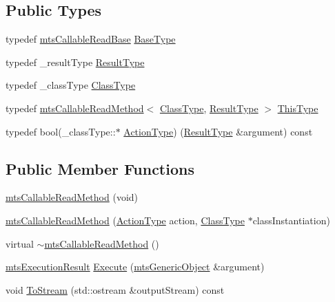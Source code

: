 \subsection*{Public Types}
\begin{DoxyCompactItemize}
\item 
typedef \hyperlink{classmts_callable_read_base}{mts\+Callable\+Read\+Base} \hyperlink{classmts_callable_read_method_a83876b0239f91889b077ab015b11f297}{Base\+Type}
\item 
typedef \+\_\+result\+Type \hyperlink{classmts_callable_read_method_ae1add51b4fb434797e00a79fe31aa7de}{Result\+Type}
\item 
typedef \+\_\+class\+Type \hyperlink{classmts_callable_read_method_a44650138085a29d60a4f3cb3616abbbf}{Class\+Type}
\item 
typedef \hyperlink{classmts_callable_read_method}{mts\+Callable\+Read\+Method}$<$ \hyperlink{classmts_callable_read_method_a44650138085a29d60a4f3cb3616abbbf}{Class\+Type}, \hyperlink{classmts_callable_read_method_ae1add51b4fb434797e00a79fe31aa7de}{Result\+Type} $>$ \hyperlink{classmts_callable_read_method_af176b353a29900c0d650356c559c4cdd}{This\+Type}
\item 
typedef bool(\+\_\+class\+Type\+::$\ast$ \hyperlink{classmts_callable_read_method_a9e05546d6f486e77f1df0c2b079dd7e1}{Action\+Type}) (\hyperlink{classmts_callable_read_method_ae1add51b4fb434797e00a79fe31aa7de}{Result\+Type} \&argument) const 
\end{DoxyCompactItemize}
\subsection*{Public Member Functions}
\begin{DoxyCompactItemize}
\item 
\hyperlink{classmts_callable_read_method_aaf583c2ff199486fe6691a1b50e0b67f}{mts\+Callable\+Read\+Method} (void)
\item 
\hyperlink{classmts_callable_read_method_a4295f9c815be10344bdb82a507a6906f}{mts\+Callable\+Read\+Method} (\hyperlink{classmts_callable_read_method_a9e05546d6f486e77f1df0c2b079dd7e1}{Action\+Type} action, \hyperlink{classmts_callable_read_method_a44650138085a29d60a4f3cb3616abbbf}{Class\+Type} $\ast$class\+Instantiation)
\item 
virtual \hyperlink{classmts_callable_read_method_a5ec1e7cf4524e99d9d08869395dc4e97}{$\sim$mts\+Callable\+Read\+Method} ()
\item 
\hyperlink{classmts_execution_result}{mts\+Execution\+Result} \hyperlink{classmts_callable_read_method_a832d2b329b3579304e1049be4d175b8d}{Execute} (\hyperlink{classmts_generic_object}{mts\+Generic\+Object} \&argument)
\item 
void \hyperlink{classmts_callable_read_method_ae08bd42677d0895a7fd4c80cc54cb4ff}{To\+Stream} (std\+::ostream \&output\+Stream) const 
\end{DoxyCompactItemize}

